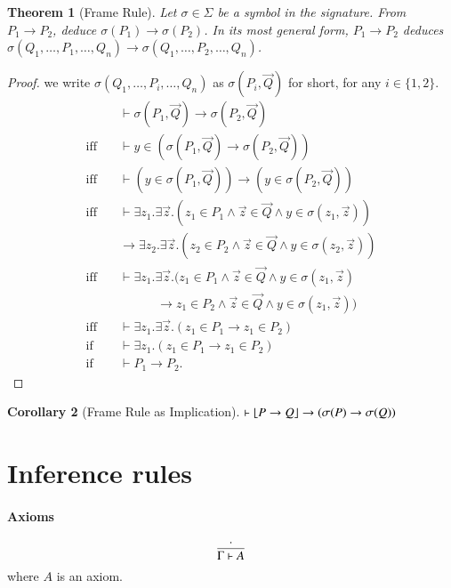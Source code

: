\documentclass{article}
\theoremstyle{plain}
\newtheorem{thm}{Theorem}
\newtheorem{cor}[thm]{Corollary}
\DeclarePairedDelimiter\floor{\lfloor}{\rfloor}
\begin{document}
\begin{thm} [Frame Rule]
	Let $\sigma \in \Sigma$ be a symbol in the signature. From $P_1 \to P_2$, deduce $\sigma(P_1) \to \sigma(P_2)$. In its most general form, $P_1 \to P_2$ deduces $\sigma(Q_1,\dots,P_1,\dots,Q_n) \to \sigma(Q_1,\dots, P_2, \dots, Q_n)$.
\end{thm}
\begin{proof}
	we write $\sigma(Q_1,\dots,P_i,\dots,Q_n)$ as $\sigma(P_i,\vec{Q})$ for short, for any $i \in \{1,2\}$.
	\begin{align*}
	&\vdash \sigma(P_1, \vec{Q}) \to \sigma(P_2,\vec{Q}) \\
	\text{iff} \quad &\vdash y \in (\sigma(P_1, \vec{Q}) \to \sigma(P_2,\vec{Q})) \\
	\text{iff} \quad &\vdash (y \in \sigma(P_1, \vec{Q})) \to (y \in \sigma(P_2, \vec{Q})) \\
	\text{iff} \quad &\vdash \exists z_1 . \exists \vec{z} . (z_1 \in P_1 \wedge \vec{z} \in \vec{Q} \wedge y \in \sigma(z_1, \vec{z})) \\
	&\to \exists z_2 . \exists \vec{z} . (z_2 \in P_2 \wedge \vec{z} \in \vec{Q} \wedge y \in \sigma(z_2, \vec{z})) \\
	\text{iff} \quad &\vdash \exists z_1 . \exists \vec{z} . (z_1 \in P_1 \wedge \vec{z} \in \vec{Q} \wedge y \in \sigma(z_1, \vec{z}) \\
	 &\quad \quad \quad \to z_1 \in P_2 \wedge \vec{z} \in \vec{Q} \wedge y \in \sigma(z_1, \vec{z})) \\
	\text{iff} \quad &\vdash \exists z_1. \exists \vec{z} . (z_1 \in P_1 \to z_1 \in P_2) \\
	\text{if} \quad &\vdash \exists z_1 .  (z_1 \in P_1 \to z_1 \in P_2) \\
	\text{if} \quad &\vdash P_1 \to P_2.
	\end{align*}
\end{proof}
\begin{cor} [Frame Rule as Implication]
	$\vdash \floor*{P \to Q} \to (\sigma(P) \to \sigma(Q))$
\end{cor}

\section{Inference rules}

\paragraph{Axioms}
$$
\infer{\Gamma \vdash A}{\cdot}
$$
where $A$ is an axiom. 
\end{document}
